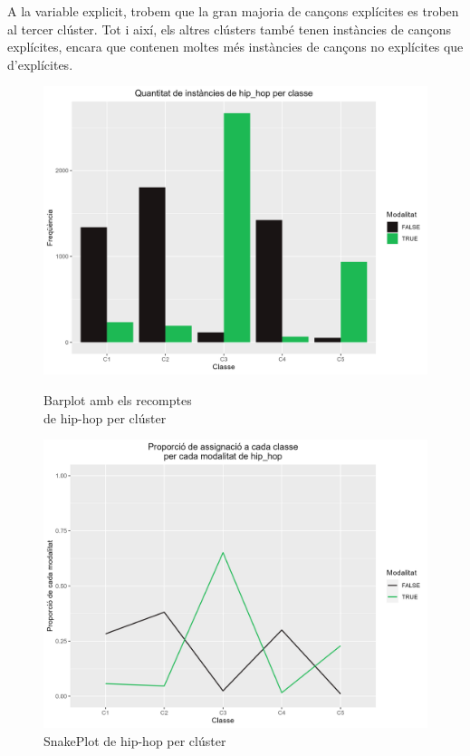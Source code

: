 \documentclass{article}
\begin{document}
A la variable explicit, trobem que la gran majoria de cançons explícites es troben al tercer clúster. Tot i així, els altres clústers també tenen instàncies de cançons explícites, encara que contenen moltes més instàncies de cançons no explícites que d'explícites.

\begin{figure}[H]
\centering
    \begin{minipage}{.49\textwidth}
        \centering
        \includegraphics[width=0.95\linewidth]{Images/5_Profiling/categoriques/cat/Cat_BarPlot_hip_hop.png}
        \caption{Barplot amb els recomptes \\ de hip-hop per clúster}
        \label{fig:Cat_BarPlot_gender}
    \end{minipage}%
    \begin{minipage}{.49\textwidth}
        \centering
        \includegraphics[width=0.95\linewidth]{Images/5_Profiling/categoriques/cat/Cat_SnakePlot_hip_hop.png}
        \caption{SnakePlot de hip-hop per clúster}
        \label{fig:Cat_SnakePlot_hip_hop}
    \end{minipage}%
\end{figure}
\end{document}

